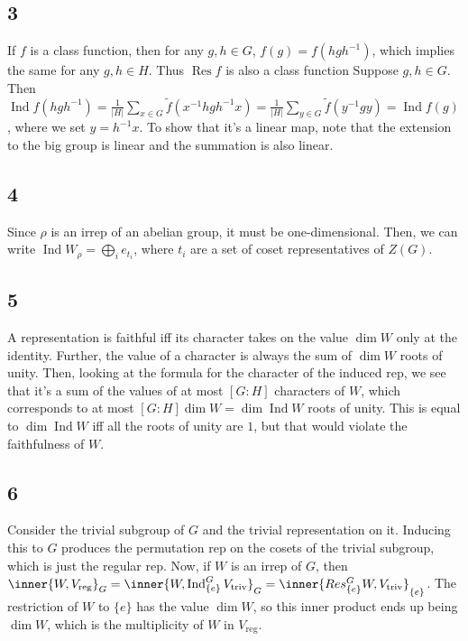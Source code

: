 \documentclass{article}
\DeclareMathOperator{\Res}{Res}
\DeclareMathOperator{\Ind}{Ind}
\begin{document}
\subsection*{3}
If $f$ is a class function, then for any $g,h\in G$, $f(g)=f(hgh^{-1})$, which implies the same for any $g,h\in H$. Thus $\Res f$ is also a class function
Suppose $g,h\in G$. Then $\Ind f(hgh^{-1})=\frac{1}{|H|}\sum_{x\in G}\tilde{f}(x^{-1}hgh^{-1}x)=\frac{1}{|H|}\sum_{y\in G}\tilde{f}(y^{-1}gy)=\Ind f(g)$, where we set $y=h^{-1}x$. To show that it's a linear map, note that the extension to the big group is linear and the summation is also linear.
\subsection*{4}
Since $\rho$ is an irrep of an abelian group, it must be one-dimensional. Then, we can write $\Ind W_\rho=\bigoplus_i e_{t_i}$, where $t_i$ are a set of coset representatives of $Z(G)$. 
\subsection*{5}
A representation is faithful iff its character takes on the value $\dim W$ only at the identity. Further, the value of a character is always the sum of $\dim W$ roots of unity. Then, looking at the formula for the character of the induced rep, we see that it's a sum of the values of at most $[G:H]$ characters of $W$, which corresponds to at most $[G:H]\dim W=\dim\Ind W$ roots of unity. This is equal to $\dim\Ind W$ iff all the roots of unity are $1$, but that would violate the faithfulness of $W$.
\subsection*{6}
Consider the trivial subgroup of $G$ and the trivial representation on it. Inducing this to $G$ produces the permutation rep on the cosets of the trivial subgroup, which is just the regular rep. Now, if $W$ is an irrep of $G$, then $\inner{W,V_\text{reg}}_G=\inner{W,\Ind_{\{e\}}^GV_\text{triv}}_G=\inner{Res_{\{e\}}^GW,V_\text{triv}}_{\{e\}}$. The restriction of $W$ to $\{e\}$ has the value $\dim W$, so this inner product ends up being $\dim W$, which is the multiplicity of $W$ in $V_\text{reg}$.
\end{document}
